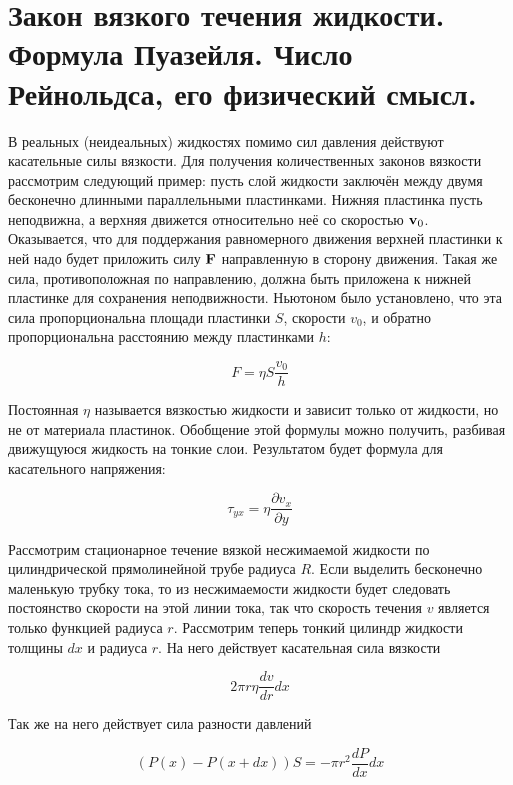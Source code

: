 \section{Закон вязкого течения жидкости. Формула Пуазейля. Число Рейнольдса, его физический смысл.}

В реальных (неидеальных) жидкостях помимо сил давления действуют касательные силы вязкости. Для получения количественных законов вязкости рассмотрим следующий пример: пусть слой жидкости заключён между двумя бесконечно длинными параллельными пластинками. Нижняя пластинка пусть неподвижна, а верхняя движется относительно неё со скоростью $\mathbf v_0$. Оказывается, что для поддержания равномерного движения верхней пластинки к ней надо будет приложить силу $\mathbf F$ направленную в сторону движения. Такая же сила, противоположная по направлению, должна быть приложена к нижней пластинке для сохранения неподвижности. Ньютоном было установлено, что эта сила пропорциональна площади пластинки $S$, скорости $v_0$, и обратно пропорциональна расстоянию между пластинками $h$:

\begin{equation} \label{eq:закон вязкости ньютона}
    F = \eta S \frac{v_0}{h}
\end{equation}

Постоянная $\eta$ называется вязкостью жидкости и зависит только от жидкости, но не от материала пластинок. Обобщение этой формулы можно получить, разбивая движущуюся жидкость на тонкие слои. Результатом будет формула для касательного напряжения:

\begin{equation}
    \tau_{yx} = \eta \frac{\partial v_x}{\partial y}
\end{equation}

Рассмотрим стационарное течение вязкой несжимаемой жидкости по цилиндрической прямолинейной трубе радиуса $R$. Если выделить бесконечно маленькую трубку тока, то из несжимаемости жидкости будет следовать постоянство скорости на этой линии тока, так что скорость течения $v$ является только функцией радиуса $r$. Рассмотрим теперь тонкий цилиндр жидкости толщины $dx$ и радиуса $r$. На него действует касательная сила вязкости

\begin{equation*}
    2 \pi r \eta \frac{dv}{dr} dx
\end{equation*}

\noindent
Так же на него действует сила разности давлений

\begin{equation*}
    \left( P(x) - P(x + dx) \right) S = - \pi r^2 \frac{dP}{dx} dx
\end{equation*}

